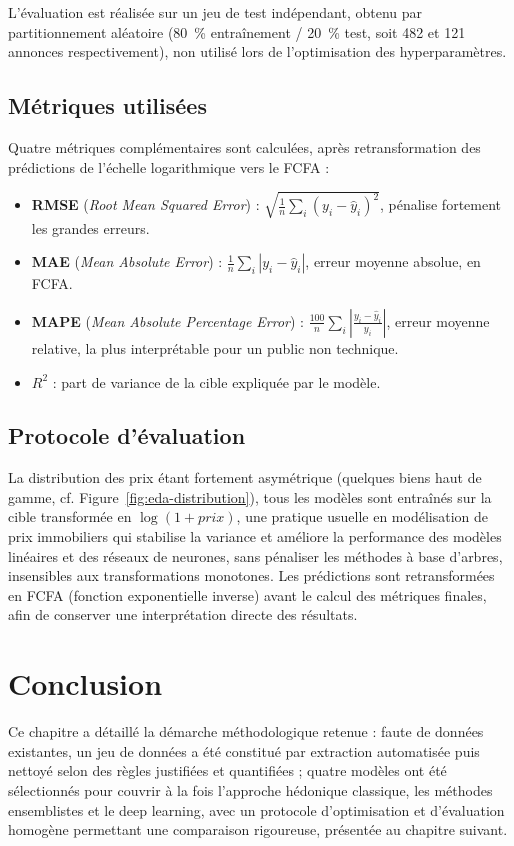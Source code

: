 L'évaluation est réalisée sur un jeu de test indépendant, obtenu par partitionnement
aléatoire (80~\% entraînement / 20~\% test, soit 482 et 121 annonces respectivement), non
utilisé lors de l'optimisation des hyperparamètres.

\subsection{Métriques utilisées}

Quatre métriques complémentaires sont calculées, après retransformation des prédictions de
l'échelle logarithmique vers le FCFA :

\begin{itemize}
  \item \textbf{RMSE} (\emph{Root Mean Squared Error}) : $\sqrt{\frac{1}{n}\sum_i (y_i -
  \hat{y}_i)^2}$, pénalise fortement les grandes erreurs.
  \item \textbf{MAE} (\emph{Mean Absolute Error}) : $\frac{1}{n}\sum_i |y_i - \hat{y}_i|$,
  erreur moyenne absolue, en FCFA.
  \item \textbf{MAPE} (\emph{Mean Absolute Percentage Error}) : $\frac{100}{n}\sum_i
  \left|\frac{y_i - \hat{y}_i}{y_i}\right|$, erreur moyenne relative, la plus interprétable pour
  un public non technique.
  \item \textbf{$R^2$} : part de variance de la cible expliquée par le modèle.
\end{itemize}

\subsection{Protocole d'évaluation}

La distribution des prix étant fortement asymétrique (quelques biens haut de gamme, cf.
Figure~\ref{fig:eda-distribution}), tous les modèles sont entraînés sur la cible transformée en
$\log(1+prix)$, une pratique usuelle en modélisation de prix immobiliers qui stabilise la
variance et améliore la performance des modèles linéaires et des réseaux de neurones, sans
pénaliser les méthodes à base d'arbres, insensibles aux transformations monotones. Les
prédictions sont retransformées en FCFA (fonction exponentielle inverse) avant le calcul des
métriques finales, afin de conserver une interprétation directe des résultats.

\section{Conclusion}

Ce chapitre a détaillé la démarche méthodologique retenue : faute de données existantes, un
jeu de données a été constitué par extraction automatisée puis nettoyé selon des règles
justifiées et quantifiées ; quatre modèles ont été sélectionnés pour couvrir à la fois
l'approche hédonique classique, les méthodes ensemblistes et le deep learning, avec un
protocole d'optimisation et d'évaluation homogène permettant une comparaison rigoureuse,
présentée au chapitre suivant.
